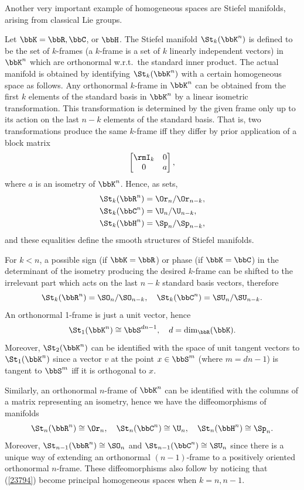 Another very important example of homogeneous spaces are Stiefel manifolds, arising from classical Lie groups.

\begin{defn}\label{def stiefel manifolds}
    Let $\bbK=\bbR,\bbC$, or $\bbH$. The Stiefel manifold $\St_k(\bbK^n)$ is defined to be the set of $k$-frames (a $k$-frame is a set of $k$ linearly independent vectors) in $\bbK^n$ which are orthonormal w.r.t.\ the standard inner product. The actual manifold is obtained by identifying $\St_k(\bbK^n)$ with a certain homogeneous space as follows. Any orthonormal $k$-frame in $\bbK^n$ can be obtained from the first $k$ elements of the standard basis in $\bbK^n$ by a linear isometric transformation. This transformation is determined by the given frame only up to its action on the last $n-k$ elements of the standard basis. That is, two transformations produce the same $k$-frame iff they differ by prior application of a block matrix 
    \[\begin{bmatrix}
        \rmI_k&0\\0&a
    \end{bmatrix}, \]
    where $a$ is an isometry of $\bbK^n$. Hence, as sets,
    \begin{align}
        \St_k(\bbR^n)&=\Or_n\slash \Or_{n-k},\\
        \St_k(\bbC^n)&=\U_n\slash \U_{n-k},\\
        \St_k(\bbH^n)&=\Sp_n\slash \Sp_{n-k},
    \end{align}
    and these equalities define the smooth structures of Stiefel manifolds.
\end{defn}
\begin{rem}
    For $k<n$, a possible sign (if $\bbK=\bbR$) or phase (if $\bbK=\bbC$) in the determinant of the isometry producing the desired $k$-frame can be shifted to the irrelevant part which acts on the last $n-k$ standard basis vectors, therefore
    \[\St_k(\bbR^n)=\SO_n\slash \SO_{n-k},\quad \St_k(\bbC^n)=\SU_n\slash \SU_{n-k}.\label{23794}\]
    An orthonormal 1-frame is just a unit vector, hence
    \[\St_1(\bbK^n)\cong \bbS^{dn-1},\quad d=\dim_\bbR(\bbK).\]
    Moreover, $\St_2(\bbK^n)$ can be identified with the space of unit tangent vectors to $\St_1(\bbK^n)$  since a vector $v$ at the point $x\in \bbS^m$ (where $m=dn-1$) is tangent to $\bbS^m$ iff it is orthogonal to $x$.
    
    Similarly, an orthonormal $n$-frame of $\bbK^n$ can be identified with the columns of a matrix representing an isometry, hence we have the diffeomorphisms of manifolds
    \[\St_n(\bbR^n)\cong \Or_n,\quad \St_n(\bbC^n)\cong\U_n, \quad \St_n(\bbH^n)\cong\Sp_n.\]
    Moreover, $\St_{n-1}(\bbR^n)\cong \SO_n$ and $\St_{n-1}(\bbC^n)\cong \SU_n$ since there is a unique way of extending an orthonormal $(n-1)$-frame to a positively oriented orthonormal $n$-frame. These diffeomorphisms also follow by noticing that (\ref{23794}) become principal homogeneous spaces when $k=n,n-1$.
\end{rem}


